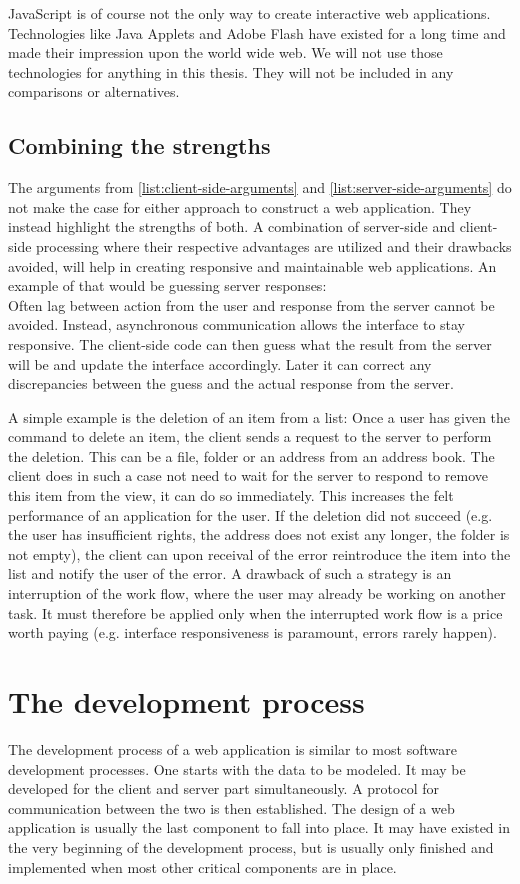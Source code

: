 \documentclass[thesis.tex]{subfiles}
\begin{document}
JavaScript is of course not the only way to create interactive web applications.
Technologies like Java Applets and Adobe Flash have existed for a long time and
made their impression upon the world wide web. We will not use those
technologies for anything in this thesis. They will not be included
in any comparisons or alternatives.

\subsection{Combining the strengths}
The arguments from
\ref{list:client-side-arguments} and \ref{list:server-side-arguments}
do not make the case for either approach to construct a web application.
They instead highlight the strengths of both.
A combination of server-side and client-side processing where their respective
advantages are utilized and their drawbacks avoided, will help in creating
responsive and maintainable web applications.
An example of that would be guessing server responses:\\
Often lag between action from the user and response from the server cannot be
avoided. Instead, asynchronous communication allows the interface to stay
responsive. The client-side code can then guess what the result from the server
will be and update the interface accordingly.
Later it can correct any discrepancies between the guess and the actual
response from the server.

A simple example is the deletion of an item from a list: Once a user has given
the command to delete an item, the client sends a request to the
server to perform the deletion. This can be a file, folder or an address from an
address book. The client does in such a case not need to wait for the server to
respond to remove this item from the view, it can do so immediately.
This increases the felt performance of an application for the user.
If the deletion did not succeed (e.g. the user has insufficient rights,
the address does not exist any longer, the folder is not empty),
the client can upon receival of the error reintroduce the item into the list and
notify the user of the error.
A drawback of such a strategy is an interruption of the work flow,
where the user may already be working on another task.
It must therefore be applied only when the interrupted work flow is a price
worth paying (e.g. interface responsiveness is paramount, errors rarely happen). 

\section{The development process}
The development process of a web application is similar to most
software development processes. One starts with the data to be modeled.
It may be developed for the client and server part simultaneously.
A protocol for communication between the two is then established.
The design of a web application is usually the last component to fall
into place. It may have existed in the very beginning of the development
process, but is usually only finished and implemented when most other critical
components are in place.
\end{document}
